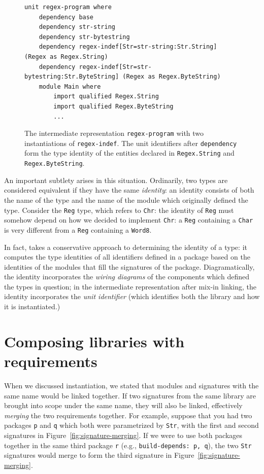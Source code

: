 \begin{figure}
\begin{verbatim}
unit regex-program where
    dependency base
    dependency str-string
    dependency str-bytestring
    dependency regex-indef[Str=str-string:Str.String] (Regex as Regex.String)
    dependency regex-indef[Str=str-bytestring:Str.ByteString] (Regex as Regex.ByteString)
    module Main where
        import qualified Regex.String
        import qualified Regex.ByteString
        ...
\end{verbatim}
\caption{The intermediate representation \texttt{regex-program} with two instantiations of \texttt{regex-indef}.  The unit identifiers after \texttt{dependency} form the type identity of the entities declared in \texttt{Regex.String} and \texttt{Regex.ByteString}.}
\label{fig:matcher-twice-bkp}
\end{figure}

An important subtlety arises in this situation.  Ordinarily, two types
are considered equivalent if they have the same \emph{identity}: an
identity consists of both the name of the type and the name of the
module which originally defined the type.  Consider the \verb|Reg| type,
which refers to \verb|Chr|: the identity of \verb|Reg| must somehow
depend on how we decided to implement \verb|Chr|: a \verb|Reg|
containing a \verb|Char| is very different from a \verb|Reg| containing
a \verb|Word8|.

In fact, \Backpack{} takes a conservative approach to determining the
identity of a type: it computes the type identities of all identifiers
defined in a package based on the identities of the modules that fill
the signatures of the package.  Diagramatically, the identity
incorporates the \emph{wiring diagrams} of the components which defined
the types in question; in the intermediate representation after mix-in
linking, the identity incorporates the \emph{unit identifier} (which
identifies both the library and how it is instantiated.)

\section{Composing libraries with requirements}

When we discussed instantiation, we stated that modules and signatures
with the same name would be linked together.  If two signatures from the
same library are brought into scope under the same name, they will also
be linked, effectively \emph{merging} the two requirements together.
For example, suppose that you had two packages \verb|p| and \verb|q|
which both were parametrized by \verb|Str|, with the first and second
signatures in Figure~\ref{fig:signature-merging}.  If we were to use
both packages together in the same third package \verb|r| (e.g.,
\verb|build-depends: p, q|), the two \verb|Str| signatures would merge
to form the third signature in Figure~\ref{fig:signature-merging}.

